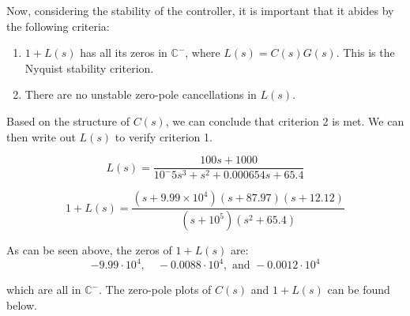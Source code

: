 \documentclass[10pt]{article}
\begin{document}
Now, considering the stability of the controller, it is important that it abides by the following criteria:

\begin{enumerate}
    \item $1 + L(s)$ has all its zeros in $\mathbb{C}^-$, where $L(s) = C(s)G(s)$. This is the Nyquist stability criterion.
    \item There are no unstable zero-pole cancellations in $L(s)$.
\end{enumerate}

Based on the structure of $C(s)$, we can conclude that criterion 2 is met. We can then write out $L(s)$ to verify criterion 1.

\begin{equation*}
L(s) = \frac{100s + 1000}{10^-5s^3+s^2+0.000654s+65.4}
\end{equation*}

\begin{equation*}
    1+L(s) = \frac{(s + 9.99 \times 10^4)(s+87.97)(s+12.12)}{(s+10^5)(s^2+65.4)}
\end{equation*}

As can be seen above, the zeros of $1+L(s)$ are:
\begin{equation*}
    -9.99\cdot 10^4, \quad -0.0088\cdot 10^4, \text{ and } -0.0012\cdot 10^4
\end{equation*}

which are all in $\mathbb{C}^-$. The zero-pole plots of $C(s)$ and $1 + L(s)$ can be found below.
\end{document}
